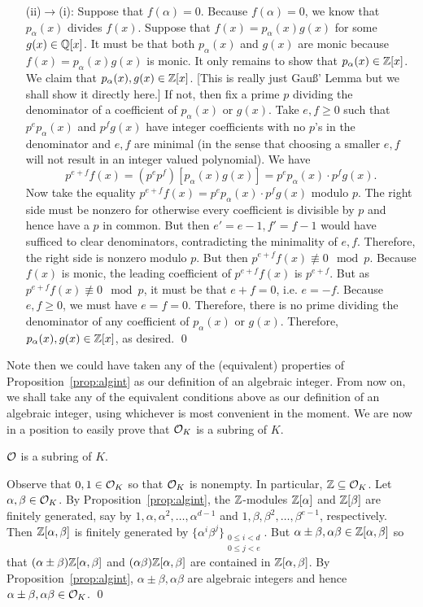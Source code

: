 \begin{enumerate}
\item[(ii)$\to$(i):] Suppose that $f(\alpha)=0$. Because $f(\alpha)= 0$, we know that $p_\alpha(x)$ divides $f(x)$. Suppose that $f(x)= p_\alpha(x)g(x)$ for some $g(x) \in \mathbb{Q}[x]$. It must be that both $p_\alpha(x)$ and $g(x)$ are monic because $f(x)= p_\alpha(x) g(x)$ is monic. It only remains to show that $p_\alpha(x) \in \mathbb{Z}[x]$. We claim that $p_\alpha(x),g(x) \in \mathbb{Z}[x]$. [This is really just Gau\ss' Lemma but we shall show it directly here.] If not, then fix a prime $p$ dividing the denominator of a coefficient of $p_\alpha(x)$ or $g(x)$. Take $e,f \geq 0$ such that $p^ep_\alpha(x)$ and $p^fg(x)$ have integer coefficients with no $p$'s in the denominator and $e,f$ are minimal (in the sense that choosing a smaller $e,f$ will not result in an integer valued polynomial). We have
	\[
	p^{e+f} f(x) = (p^e p^f) [p_\alpha(x) g(x) ]= p^e p_\alpha(x) \cdot p^f g(x).
	\]
Now take the equality $p^{e+f} f(x)= p^e p_\alpha(x) \cdot p^f g(x)$ modulo $p$. The right side must be nonzero for otherwise every coefficient is divisible by $p$ and hence have a $p$ in common. But then $e'= e-1, f'= f-1$ would have sufficed to clear denominators, contradicting the minimality of $e, f$. Therefore, the right side is nonzero modulo $p$. But then $p^{e+f} f(x) \not\equiv 0 \mod p$. Because $f(x)$ is monic, the leading coefficient of $p^{e+f} f(x)$ is $p^{e+f}$. But as $p^{e+f} f(x) \not\equiv 0 \mod p$, it must be that $e+f= 0$, i.e. $e= -f$. Because $e,f \geq 0$, we must have $e= f= 0$. Therefore, there is no prime dividing the denominator of any coefficient of $p_\alpha(x)$ or $g(x)$. Therefore, $p_\alpha(x),g(x) \in \mathbb{Z}[x]$, as desired. \qed \pskip
\end{enumerate}


Note then we could have taken any of the (equivalent) properties of Proposition~\ref{prop:algint} as our definition of an algebraic integer. From now on, we shall take any of the equivalent conditions above as our definition of an algebraic integer, using whichever is most convenient in the moment. We are now in a position to easily prove that $\mathcal{O}_K$ is a subring of $K$. 


\begin{prop} \label{prop:subring}
$\mathcal{O}$ is a subring of $K$.
\end{prop}

\pf Observe that $0,1 \in \mathcal{O}_K$ so that $\mathcal{O}_K$ is nonempty. In particular, $\mathbb{Z} \subseteq \mathcal{O}_K$. Let $\alpha, \beta \in \mathcal{O}_K$. By Proposition~\ref{prop:algint}, the $\mathbb{Z}$-modules $\mathbb{Z}[\alpha]$ and $\mathbb{Z}[\beta]$ are finitely generated, say by $1, \alpha, \alpha^2, \ldots, \alpha^{d-1}$ and $1, \beta, \beta^2, \ldots, \beta^{e-1}$, respectively. Then $\mathbb{Z}[\alpha, \beta]$ is finitely generated by $\{\alpha^i \beta^j\}_{\substack{0 \leq i < d \\ 0 \leq j < e}}$. But $\alpha \pm \beta, \alpha\beta \in \mathbb{Z}[\alpha, \beta]$ so that $(\alpha \pm \beta) \mathbb{Z}[\alpha, \beta]$ and $(\alpha \beta) \mathbb{Z}[\alpha, \beta]$ are contained in $\mathbb{Z}[\alpha, \beta]$. By Proposition~\ref{prop:algint}, $\alpha \pm \beta, \alpha \beta$ are algebraic integers and hence $\alpha \pm \beta, \alpha \beta \in \mathcal{O}_K$. \qed \pskip


